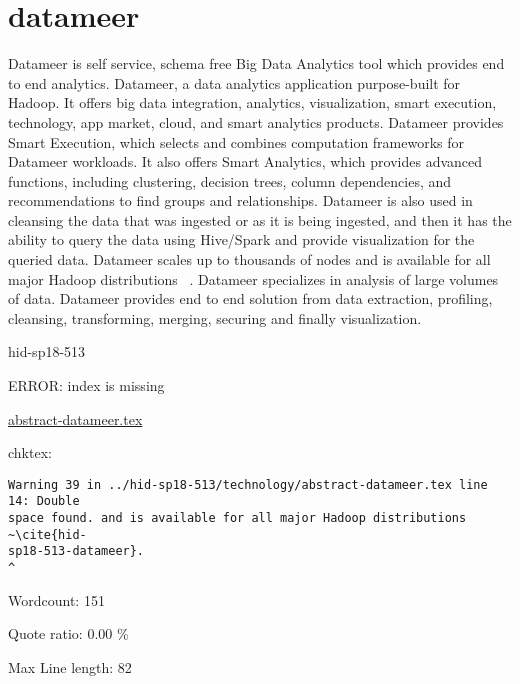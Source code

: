 \section{datameer}

Datameer is self service, schema free Big Data Analytics tool which provides 
end to end analytics. Datameer, a data analytics application purpose-built for 
Hadoop. It offers big data integration, analytics, visualization, smart 
execution, technology, app market, cloud, and smart analytics products. 
Datameer provides Smart Execution, which selects and combines computation 
frameworks for Datameer workloads. It also offers Smart Analytics, which 
provides advanced functions, including clustering, decision trees, column 
dependencies, and recommendations to find groups and relationships. Datameer is
also used in cleansing the data that was ingested or as it is being ingested, 
and then it has the ability to query the data using Hive/Spark and provide 
visualization for the queried data. Datameer scales up to thousands of nodes
and is available for all major Hadoop distributions ~\cite{hid-sp18-513-datameer}.
Datameer specializes in analysis of large volumes of data. Datameer provides 
end to end solution from data extraction, profiling, cleansing, transforming,
merging, securing and finally visualization. 


\begin{IU}

hid-sp18-513

ERROR: index is missing

\href{https://github.com/cloudmesh-community/hid-sp18-513/blob/master//technology/abstract-datameer.tex}{abstract-datameer.tex}

 
chktex:
\begin{tiny}
\begin{verbatim}
Warning 39 in ../hid-sp18-513/technology/abstract-datameer.tex line 14: Double
space found. and is available for all major Hadoop distributions ~\cite{hid-
sp18-513-datameer}.                                                      ^
\end{verbatim}
\end{tiny}

Wordcount: 151


Quote ratio: 0.00 \%
 
Max Line length: 82
\end{IU}


